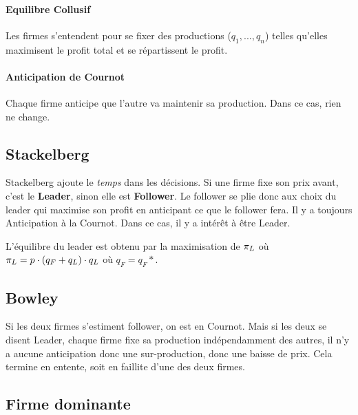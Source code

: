 \paragraph{Equilibre Collusif}
Les firmes s'entendent pour se fixer des productions ($q_1,...,q_n$) telles
qu'elles maximisent le profit total et se répartissent le profit.

\paragraph{Anticipation de Cournot}
Chaque firme anticipe que l'autre va maintenir sa production.
Dans ce cas, rien ne change.


\subsection{Stackelberg}
Stackelberg ajoute le \emph{temps} dans les décisions. Si une firme fixe son
prix avant, c'est le \textbf{Leader}, sinon elle est \textbf{Follower}.
Le follower se plie donc aux choix du leader qui maximise son profit en
anticipant ce que le follower fera. Il y a toujours Anticipation à la Cournot.
Dans ce cas, il y a intérêt à être Leader.

L'équilibre du leader est obtenu par la maximisation de $\pi_L$ où 
$\pi_L = p\cdot (q_F+q_L)\cdot q_L$ où $q_F = q_F*$. 

\subsection{Bowley}
Si les deux firmes s'estiment follower, on est en Cournot. Mais si les deux se
disent Leader, chaque firme fixe sa production indépendamment des autres,
il n'y a aucune anticipation donc une sur-production, donc une baisse de prix.
Cela termine en entente, soit en faillite d'une des deux firmes.

\subsection{Firme dominante}

